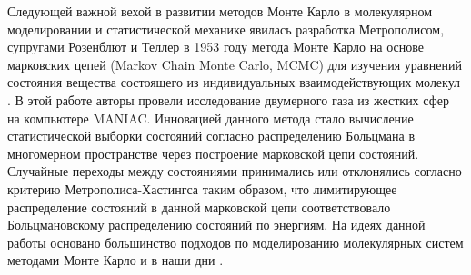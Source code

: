 Следующей важной вехой в развитии методов Монте Карло в молекулярном моделировании и статистической механике явилась разработка Метрополисом, супругами Розенблют и Теллер в 1953 году метода Монте Карло на основе марковских цепей (Markov Chain Monte Carlo, MCMC) для изучения уравнений состояния вещества состоящего из индивидуальных взаимодействующих молекул \cite{metropolis_equation_1953}. В этой работе авторы провели исследование двумерного газа из жестких сфер на компьютере MANIAC. Инновацией данного метода стало вычисление статистической выборки состояний согласно распределению Больцмана в многомерном пространстве через построение марковской цепи состояний. Случайные переходы между состояниями принимались или отклонялись согласно критерию Метрополиса-Хастингса таким образом, что лимитирующее распределение состояний в данной марковской цепи соответствовало Больцмановскому распределению состояний по энергиям. На идеях данной работы основано большинство подходов по моделированию молекулярных систем методами Монте Карло и в наши дни \cite{ivanov_methods_2009}.

